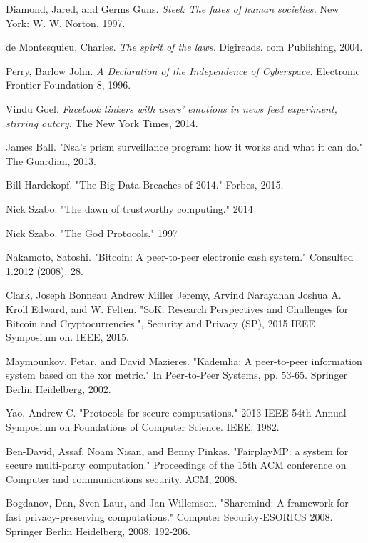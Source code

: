 \documentclass{article} \usepackage{nips13submit_e,times}
\begin{document}
\begin{thebibliography}{56}

Diamond, Jared, and Germs Guns. \emph{Steel: The fates of human societies.} New York: W. W. Norton, 1997.

de Montesquieu, Charles. \emph{The spirit of the laws.} Digireads. com Publishing, 2004.

 Perry, Barlow John. \emph{A Declaration of the Independence of Cyberspace.} Electronic Frontier Foundation 8, 1996.

Vindu Goel. \emph{Facebook tinkers with users’ emotions in news feed experiment, stirring outcry.} The New York Times, 2014.


James Ball. "Nsa’s prism surveillance program: how it works and what it can do." The Guardian, 2013.

 Bill Hardekopf. "The Big Data Breaches of 2014." Forbes, 2015.
 
 Nick Szabo. "The dawn of trustworthy computing." 2014
 
 Nick Szabo. "The God Protocols." 1997

Nakamoto, Satoshi. "Bitcoin: A peer-to-peer electronic cash system." Consulted 1.2012 (2008): 28.

Clark, Joseph Bonneau Andrew Miller Jeremy, Arvind Narayanan Joshua A. Kroll Edward, and W. Felten. "SoK: Research Perspectives and Challenges for Bitcoin and Cryptocurrencies.", Security and Privacy (SP), 2015 IEEE Symposium on. IEEE, 2015.


Maymounkov, Petar, and David Mazieres. "Kademlia: A peer-to-peer information system based on the xor metric." In Peer-to-Peer Systems, pp. 53-65. Springer Berlin Heidelberg, 2002.

Yao, Andrew C. "Protocols for secure computations." 2013 IEEE 54th Annual Symposium on Foundations of Computer Science. IEEE, 1982.

Ben-David, Assaf, Noam Nisan, and Benny Pinkas. "FairplayMP: a system for secure multi-party computation." Proceedings of the 15th ACM conference on Computer and communications security. ACM, 2008.

Bogdanov, Dan, Sven Laur, and Jan Willemson. "Sharemind: A framework for fast privacy-preserving computations." Computer Security-ESORICS 2008. Springer Berlin Heidelberg, 2008. 192-206.


\end{thebibliography}
\end{document}
